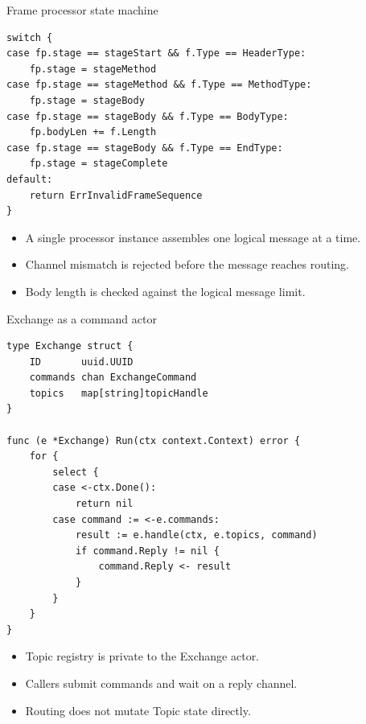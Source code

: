 \documentclass[aspectratio=169,10pt]{beamer}
\begin{document}
\begin{frame}[fragile]{Frame processor state machine}
  \begin{lstlisting}[style=go]
switch {
case fp.stage == stageStart && f.Type == HeaderType:
    fp.stage = stageMethod
case fp.stage == stageMethod && f.Type == MethodType:
    fp.stage = stageBody
case fp.stage == stageBody && f.Type == BodyType:
    fp.bodyLen += f.Length
case fp.stage == stageBody && f.Type == EndType:
    fp.stage = stageComplete
default:
    return ErrInvalidFrameSequence
}
  \end{lstlisting}
  \begin{itemize}
    \item A single processor instance assembles one logical message at a time.
    \item Channel mismatch is rejected before the message reaches routing.
    \item Body length is checked against the logical message limit.
  \end{itemize}
\end{frame}

\begin{frame}[fragile,shrink=12]{Exchange as a command actor}
  \begin{lstlisting}[style=go]
type Exchange struct {
    ID       uuid.UUID
    commands chan ExchangeCommand
    topics   map[string]topicHandle
}

func (e *Exchange) Run(ctx context.Context) error {
    for {
        select {
        case <-ctx.Done():
            return nil
        case command := <-e.commands:
            result := e.handle(ctx, e.topics, command)
            if command.Reply != nil {
                command.Reply <- result
            }
        }
    }
}
  \end{lstlisting}
  \vspace{-0.25em}
  \begin{itemize}
    \item Topic registry is private to the Exchange actor.
    \item Callers submit commands and wait on a reply channel.
    \item Routing does not mutate Topic state directly.
  \end{itemize}
\end{frame}
\end{document}
